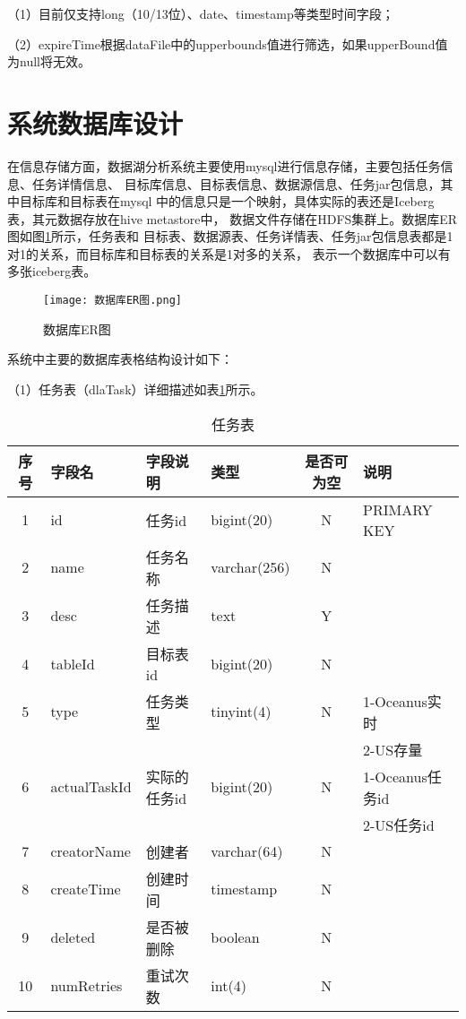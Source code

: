 （1）⽬前仅⽀持long（10/13位）、date、timestamp等类型时间字段；

（2）expireTime根据dataFile中的upperbounds值进⾏筛选，如果upperBound值为null将⽆效。

\section{系统数据库设计}

在信息存储方面，数据湖分析系统主要使用mysql进行信息存储，主要包括任务信息、任务详情信息、
目标库信息、目标表信息、数据源信息、任务jar包信息，其中目标库和目标表在mysql
中的信息只是一个映射，具体实际的表还是Iceberg表，其元数据存放在hive metastore中，
数据文件存储在HDFS集群上。数据库ER图如图\ref{fig:数据库ER图}所示，任务表和
目标表、数据源表、任务详情表、任务jar包信息表都是1对1的关系，而目标库和目标表的关系是1对多的关系，
表示一个数据库中可以有多张iceberg表。

\begin{figure}[H]
  \centering
  \texttt{[image: 数据库ER图.png]}
  \caption{数据库ER图}
  \label{fig:数据库ER图}
\end{figure}

系统中主要的数据库表格结构设计如下：

（1）任务表（dlaTask）详细描述如表\ref{tab:任务表}所示。

\begin{table}[H]
  \centering
  \caption{任务表}
  \label{tab:任务表}
  \begin{tabular}{clllcl}
    \toprule
    序号  & 字段名         & 字段说明     & 类型           & 是否可为空   & 说明  \\
    \midrule
    1    & id            & 任务id      & bigint(20)     & N          & PRIMARY KEY    \\
    2    & name          & 任务名称     & varchar(256)   & N          &     \\
    3    & desc          & 任务描述     & text           & Y          &   \\
    4    & tableId       & 目标表id     & bigint(20)     & N          &   \\
    5    & type          & 任务类型     & tinyint(4)     & N          & 1-Oceanus实时  \\
         &               &             &               &             & 2-US存量  \\
    6    & actualTaskId  & 实际的任务id  & bigint(20)    & N          &  1-Oceanus任务id  \\
         &               &             &               &             & 2-US任务id  \\
    7    & creatorName   & 创建者       & varchar(64)    & N          &   \\
    8    & createTime    & 创建时间     & timestamp      & N          &   \\
    9    & deleted       & 是否被删除    & boolean        & N          &   \\
    10   & numRetries    & 重试次数      & int(4)        & N          &   \\
    \bottomrule
  \end{tabular}
\end{table}

